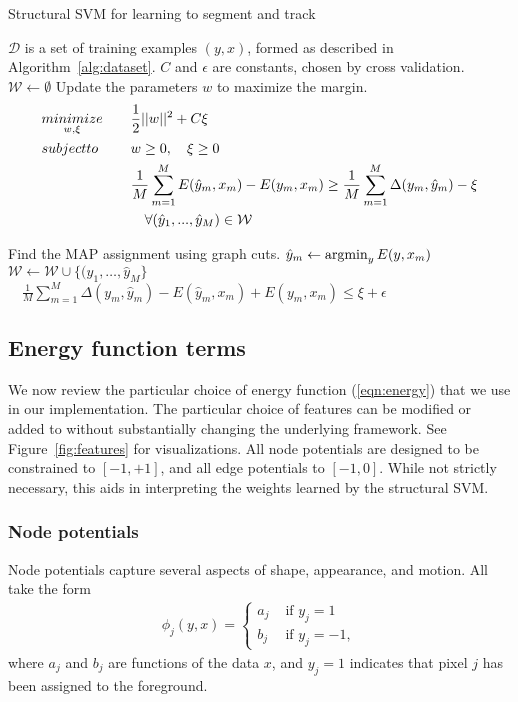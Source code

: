\documentclass[journal]{IEEEtran}
\begin{document}
\begin{algorithm*}
  \caption{Structural SVM for learning to segment and track}
  \label{alg:ssvm}
  \begin{algorithmic}
    \STATE $\mathcal{D}$ is a set of training examples $(y, x)$,                             formed as described in Algorithm~\ref{alg:dataset}.
\STATE $C$ and $\epsilon$ are constants, chosen by cross validation.
\STATE 
\STATE $\mathcal{W} \leftarrow \emptyset$
\REPEAT
\STATE Update the parameters $w$ to maximize the margin.
\begin{equation*}
  \begin{aligned}
    & \underset{w, \xi}{\relax{minimize}}\quad & & \frac{1}{2} ||w||^2 + C\xi \\
    & \relax{subject to }\quad & & w \geq 0, \quad \xi \geq 0 \\
    & & & \frac{1}{M} \sum_{m=1}^M E ( \hat{y}_m, x_m )
    - E ( y_m, x_m ) \geq \frac{1}{M} \sum_{m=1}^M \Delta(y_m, \hat{y}_m) - \xi \\
    & & & \quad \forall (\hat{y}_1, ..., \hat{y}_M) \in \mathcal{W}
  \end{aligned}
\end{equation*}

\STATE Find the MAP assignment using graph cuts.
\STATE $\hat{y}_m \leftarrow \operatorname{argmin}_y E (y, x_m )$
\ENDFOR
\STATE $\mathcal{W} \leftarrow \mathcal{W} \cup \{(\hat{y}_1, \dots, \hat{y}_M\}$
\UNTIL $\quad \frac{1}{M} \sum_{m = 1}^M \Delta(y_m, \hat{y}_m) - E ( \hat{y}_m, x_m) + E ( y_m, x_m ) \leq \xi + \epsilon$
  \end{algorithmic}
\end{algorithm*}


\subsection{Energy function terms}
\label{sec:energy}

We now review the particular choice of energy function (\ref{eqn:energy}) that we use in our implementation. The particular choice of features can be modified or added to without substantially changing the underlying framework. See Figure~\ref{fig:features} for visualizations.  All node potentials are designed to be constrained to $[-1, +1]$, and all edge potentials to $[-1, 0]$.  While not strictly necessary, this aids in interpreting the weights learned by the structural SVM.

\subsubsection{Node potentials}
\label{sec:npot}
Node potentials capture several aspects of shape, appearance, and motion.  All take the form
\begin{align}
  \label{eqn:npot}
  \phi_j(y, x) = 
  \left\{
  \begin{array}{rl}
    a_j & \mbox{ if } y_j = 1 \\
    b_j & \mbox{ if } y_j = -1,
  \end{array} 
  \right.
\end{align}
where $a_j$ and $b_j$ are functions of the data $x$, and $y_j = 1$ indicates that pixel $j$ has been assigned to the foreground.
\end{document}
